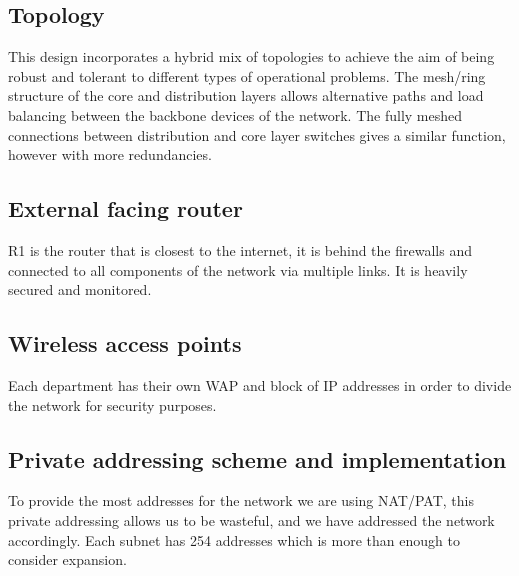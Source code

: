 \subsection{Topology}
This design incorporates a hybrid mix of topologies to achieve the aim of being robust and tolerant to different types of operational problems. The mesh/ring structure of the core and distribution layers allows alternative paths and load balancing between the backbone devices of the network. The fully meshed connections between distribution and core layer switches gives a similar function, however with more redundancies.
\subsection{External facing router}
R1 is the router that is closest to the internet, it is behind the firewalls and connected to all components of the network via multiple links. It is heavily secured and monitored.
\subsection{Wireless access points}
Each department has their own WAP and block of IP addresses in order to divide the network for security purposes. 
\subsection{Private addressing scheme and implementation}
To provide the most addresses for the network we are using NAT/PAT, this private addressing allows us to be wasteful, and we have addressed the network accordingly. Each subnet has 254 addresses which is more than enough to consider expansion.